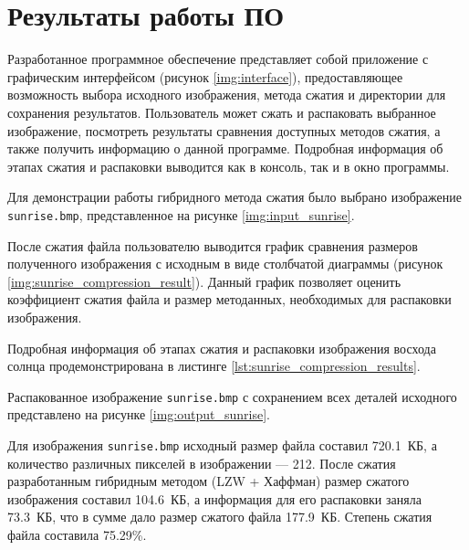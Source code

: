 \section{Результаты работы ПО}

Разработанное программное обеспечение представляет собой приложение с графическим интерфейсом (рисунок \ref{img:interface}), предоставляющее возможность выбора исходного изображения, метода сжатия и директории для сохранения результатов. Пользователь может сжать и распаковать выбранное изображение, посмотреть результаты сравнения доступных методов сжатия, а также получить информацию о данной программе.
Подробная информация об этапах сжатия и распаковки выводится как в консоль, так и в окно программы.


\clearpage

Для демонстрации работы гибридного метода сжатия было выбрано изображение \texttt{sunrise.bmp}, представленное на рисунке \ref{img:input_sunrise}.


После сжатия файла пользователю выводится график сравнения размеров полученного изображения с исходным в виде столбчатой диаграммы (рисунок \ref{img:sunrise_compression_result}). Данный график позволяет оценить коэффициент сжатия файла и размер методанных, необходимых для распаковки изображения.


Подробная информация об этапах сжатия и распаковки изображения восхода солнца продемонстрирована в листинге \ref{lst:sunrise_compression_results}.


Распакованное изображение \texttt{sunrise.bmp} с сохранением всех деталей исходного представлено на рисунке \ref{img:output_sunrise}.


Для изображения \texttt{sunrise.bmp} исходный размер файла составил 720.1~КБ, а количество различных пикселей в изображении --- 212. После сжатия разработанным гибридным методом (LZW + Хаффман) размер сжатого изображения составил 104.6~КБ, а информация для его распаковки заняла 73.3~КБ, что в сумме дало размер сжатого файла 177.9~КБ. Степень сжатия файла составила 75.29\%. 

